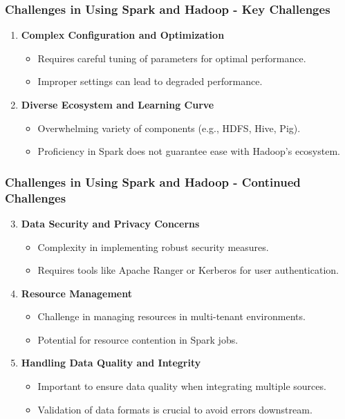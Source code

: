 \documentclass{beamer}
\begin{document}
\begin{frame}[fragile]
    \frametitle{Challenges in Using Spark and Hadoop - Key Challenges}
    \begin{enumerate}
        \item \textbf{Complex Configuration and Optimization}
            \begin{itemize}
                \item Requires careful tuning of parameters for optimal performance.
                \item Improper settings can lead to degraded performance.
            \end{itemize}
        \item \textbf{Diverse Ecosystem and Learning Curve}
            \begin{itemize}
                \item Overwhelming variety of components (e.g., HDFS, Hive, Pig).
                \item Proficiency in Spark does not guarantee ease with Hadoop's ecosystem.
            \end{itemize}
    \end{enumerate}
\end{frame}

\begin{frame}[fragile]
    \frametitle{Challenges in Using Spark and Hadoop - Continued Challenges}
    \begin{enumerate}
        \setcounter{enumi}{2} %
        \item \textbf{Data Security and Privacy Concerns}
            \begin{itemize}
                \item Complexity in implementing robust security measures.
                \item Requires tools like Apache Ranger or Kerberos for user authentication.
            \end{itemize}
        \item \textbf{Resource Management}
            \begin{itemize}
                \item Challenge in managing resources in multi-tenant environments.
                \item Potential for resource contention in Spark jobs.
            \end{itemize}
        \item \textbf{Handling Data Quality and Integrity}
            \begin{itemize}
                \item Important to ensure data quality when integrating multiple sources.
                \item Validation of data formats is crucial to avoid errors downstream.
            \end{itemize}
    \end{enumerate}
\end{frame}
\end{document}
